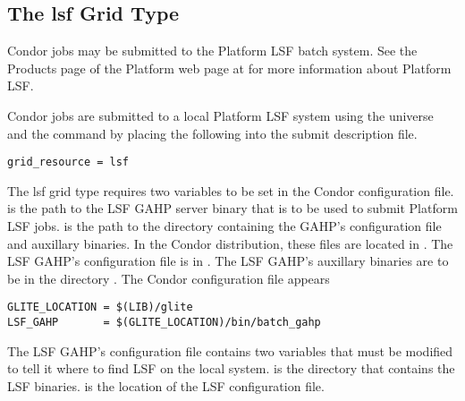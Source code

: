 
\subsection{\label{sec:LSF}The lsf Grid Type }

Condor jobs may be submitted to the Platform LSF batch system.
See the Products page of the Platform web page at
for more information about Platform LSF.

Condor jobs are submitted to a local Platform LSF system
using the  universe and the
 command  by placing the following
into the submit description file.
\begin{verbatim}
grid_resource = lsf
\end{verbatim}

The lsf grid type requires two variables to be set in the Condor
configuration file.
 is the path to the LSF GAHP server binary that is to be
used to submit Platform LSF jobs.
 is the path to the directory containing the GAHP's
configuration file and auxillary binaries.
In the Condor distribution, these files are located in 
.
The LSF GAHP's configuration file is in
.
The LSF GAHP's auxillary binaries
are to be in the directory .
The Condor configuration file appears

\footnotesize
\begin{verbatim}
GLITE_LOCATION = $(LIB)/glite
LSF_GAHP       = $(GLITE_LOCATION)/bin/batch_gahp
\end{verbatim}
\normalsize

The LSF GAHP's configuration file contains two variables that must be
modified to tell it where to find LSF on the local system.
 is the directory that contains the LSF binaries.
 is the location of the LSF configuration file.
